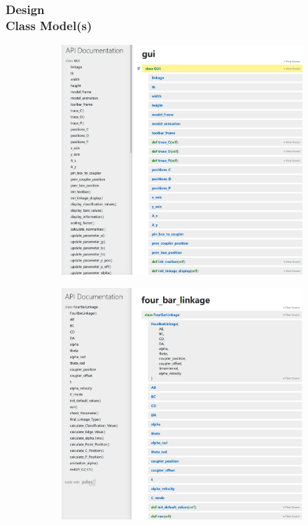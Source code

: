 \documentclass[ucs,10pt]{beamer}
\begin{document}
\begin{frame}
\frametitle{Design \\
	\small \color{rwth-blue} Class Model(s)}
	\begin{figure}
		\centering
		\begin{subfigure}[b]{0.495\textwidth}
			\centering
			\includegraphics[width=\textwidth]{./Figures/class_model/doc_gui.png}
		\end{subfigure}
		\hfill
		\begin{subfigure}[b]{0.495\textwidth}
			\centering
			\includegraphics[width=\textwidth]{./Figures/class_model/doc_four_bar_linkage.png}
		\end{subfigure}
	\end{figure}
\end{frame}
\end{document}

